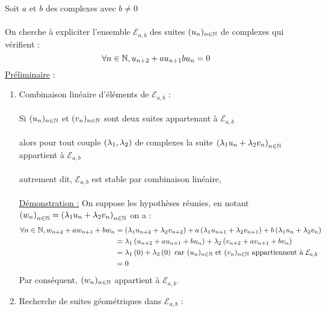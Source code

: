 \begin{dem}
    Soit \(a\) et \(b\) des complexes avec \(b\neq 0\)\\~\\
    On cherche à expliciter l'ensemble \(\mathcal{E}_{a,b}\) des suites \((u_n)_{n\in \mathbb{N}}\) de complexes qui vérifient : 
    \[\forall n \in \mathbb{N}, u_{n+2} + a u_{n+1} b u_n = 0\] 
    \underline{Préliminaire} : 
    \begin{enumerate}
        \item Combinaison linéaire d'éléments de \(\mathcal{E}_{a,b}\) : \\~\\
            Si \((u_n)_{n\in \mathbb{N}}\) et \((v_n)_{n\in \mathbb{N}}\) sont deux suites appartenant à \(\mathcal{E}_{a,b}\) \\~\\
            alors pour tout couple \(\left(\lambda_1,\lambda_2\right)\) de complexes la suite \(\left(\lambda_1 u_n + \lambda_2 v_n\right)_{n\in \mathbb{N}}\) appartient à \(\mathcal{E}_{a,b}\)\\~\\
            autrement dit, \(\mathcal{E}_{a,b}\) est stable par combinaison linéaire, \\~\\
            \underline{Démonstration :}
            On suppose les hypothèses réunies, en notant \(\left(w_n\right)_{n \in \mathbb{N}} = \left(\lambda_1 u_n + \lambda_2 v_n\right)_{n \in \mathbb{N}}\) on a :
            \begin{align*}
                \forall n \in \mathbb{N}, w_{n+2} + a w_{n+1} +b w_n &= \left(\lambda_1 u_{n+2} + \lambda_2 v_{n+2}\right) + a \left(\lambda_1 u_{n+1} + \lambda_2 v_{n+1}\right) + b\left(\lambda_1 u_n + \lambda_2 v_n\right)\\
                &=\lambda_1\left(u_{n+2} + au_{n+1} + bu_{n}\right) + \lambda_2 \left(v_{n+2} + a v_{n+1} + bv_{n}\right) \\
                &= \lambda_1 \left( 0 \right) + \lambda_2 \left(0\right) \text{ car } (u_n)_{n\in \mathbb{N}} \text{ et }(v_n)_{n\in \mathbb{N}} \text{ appartiennent à } \mathcal{E}_{a,b} \\
                &= 0
            \end{align*}
            Par conséquent, \((w_n)_{n\in \mathbb{N}}\) appartient à \(\mathcal{E}_{a,b}\).~\\
        \item Recherche de suites géométriques dans \(\mathcal{E}_{a,b}\) : \\~\\

\end{enumerate}
\end{dem}
